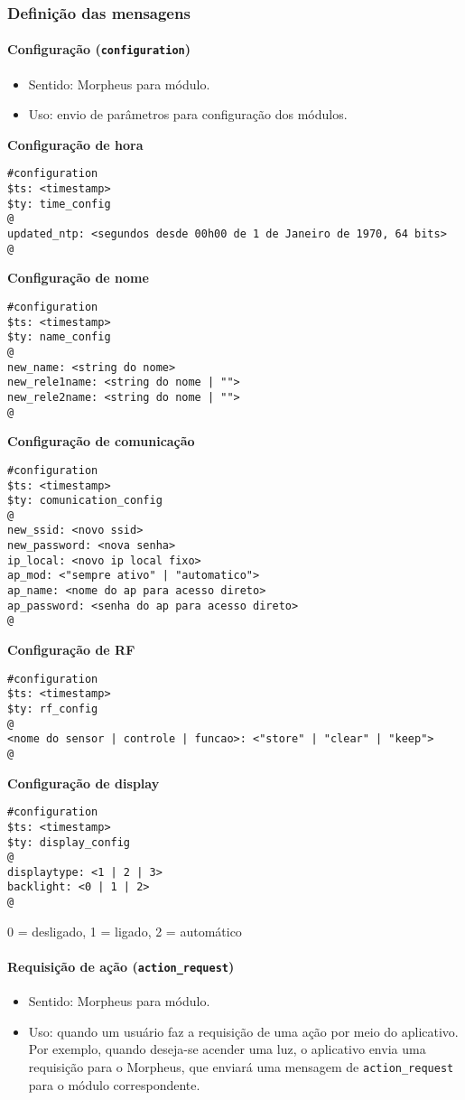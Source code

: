 \subsubsection{Definição das mensagens}

\paragraph{Configuração (\texttt{configuration})}
\begin{itemize}
\item Sentido: Morpheus para módulo.
\item Uso: envio de parâmetros para configuração dos módulos.
\end{itemize}

\textbf{Configuração de hora}
\begin{lstlisting}
#configuration
$ts: <timestamp>
$ty: time_config
@
updated_ntp: <segundos desde 00h00 de 1 de Janeiro de 1970, 64 bits>
@
\end{lstlisting}

\textbf{Configuração de nome}
\begin{lstlisting}
#configuration
$ts: <timestamp>
$ty: name_config
@
new_name: <string do nome>
new_rele1name: <string do nome | "">
new_rele2name: <string do nome | "">
@
\end{lstlisting}

\textbf{Configuração de comunicação}
\begin{lstlisting}
#configuration
$ts: <timestamp>
$ty: comunication_config
@
new_ssid: <novo ssid>
new_password: <nova senha>
ip_local: <novo ip local fixo>
ap_mod: <"sempre ativo" | "automatico">
ap_name: <nome do ap para acesso direto>
ap_password: <senha do ap para acesso direto>
@
\end{lstlisting}

\textbf{Configuração de RF}
\begin{lstlisting}
#configuration
$ts: <timestamp>
$ty: rf_config
@
<nome do sensor | controle | funcao>: <"store" | "clear" | "keep">
@
\end{lstlisting}

\textbf{Configuração de display}
\begin{lstlisting}
#configuration
$ts: <timestamp>
$ty: display_config
@
displaytype: <1 | 2 | 3>
backlight: <0 | 1 | 2>
@
\end{lstlisting}
0 = desligado, 1 = ligado, 2 = automático

\paragraph{Requisição de ação (\texttt{action\_request})}
\begin{itemize}
\item Sentido: Morpheus para módulo.
\item Uso: quando um usuário faz a requisição de uma ação por meio do aplicativo. Por exemplo, quando deseja-se acender uma luz, o aplicativo envia uma requisição para o Morpheus, que enviará uma mensagem de \texttt{action\_request} para o módulo correspondente.
\end{itemize}

